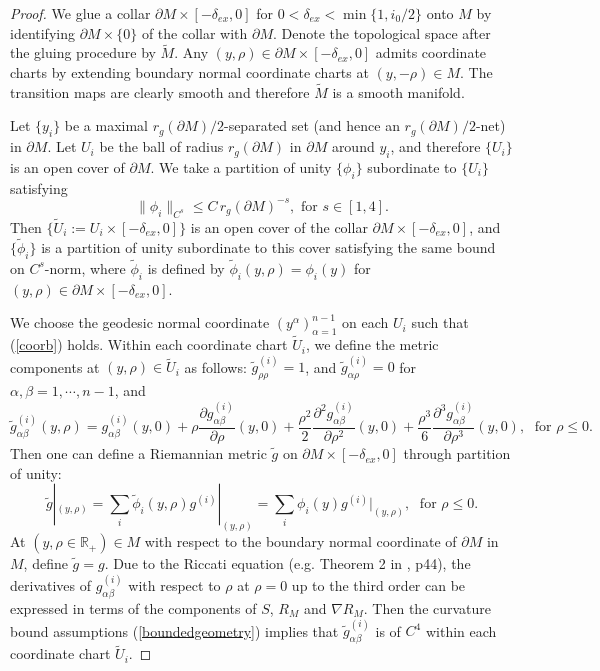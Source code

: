 \documentclass[11pt,letterpaper]{amsart}
\numberwithin{equation}{section}
\theoremstyle{definition}
\theoremstyle{plain}
\theoremstyle{definition}
\theoremstyle{plain}
\theoremstyle{definition}
\theoremstyle{plain}
\begin{document}
\begin{proof}
We glue a collar $\partial M \times [-\delta_{ex},0]$ for $0<\delta_{ex}<\min\{1,i_0/2\}$ onto $M$ by identifying $\partial M\times \{0\}$ of the collar with $\partial M$. Denote the topological space after the gluing procedure by $\widetilde{M}$. Any $(y,\rho)\in \partial M \times [-\delta_{ex},0]$ admits coordinate charts by extending boundary normal coordinate charts at $(y,-\rho)\in M$. The transition maps are clearly smooth and therefore $\widetilde{M}$ is a smooth manifold.

Let $\{y_i\}$ be a maximal $r_g(\partial M)/2$-separated set (and hence an $r_g(\partial M)/2$-net) in $\partial M$. Let $U_i$ be the ball of radius $r_g(\partial M)$ in $\partial M$ around $y_i$, and therefore $\{U_i\}$ is an open cover of $\partial M$. We take a partition of unity $\{\phi_i\}$ subordinate to $\{U_i\}$ satisfying 
$$\|\phi_i\|_{C^s}\leqslant C\,r_g(\partial M)^{-s},\textrm{ for }s\in [1,4].$$
Then $\{\widetilde{U}_i:=U_i\times [-\delta_{ex},0]\}$ is an open cover of the collar $\partial M \times [-\delta_{ex},0]$, and $\{\widetilde{\phi}_i\}$ is a partition of unity subordinate to this cover satisfying the same bound on $C^s$-norm, where $\widetilde{\phi}_i$ is defined by $\widetilde{\phi}_i(y,\rho)=\phi_i(y)$ for $(y,\rho)\in \partial M \times [-\delta_{ex},0]$.

We choose the geodesic normal coordinate $(y^{\alpha})_{\alpha=1}^{n-1}$ on each $U_i$ such that (\ref{coorb}) holds. Within each coordinate chart $\widetilde{U}_i$, we define the metric components at $(y,\rho)\in \widetilde{U}_i$ as follows: $\widetilde{g}^{(i)}_{\rho\rho}=1$, and $\widetilde{g}^{(i)}_{\alpha \rho}=0$ for $\alpha,\beta=1,\cdots,n-1$, and 
\begin{equation*}
\widetilde{g}^{(i)}_{\alpha\beta}(y,\rho)=g^{(i)}_{\alpha\beta}(y,0)+\rho \frac{\partial g^{(i)}_{\alpha\beta}}{\partial \rho} (y,0)+\frac{\rho^2}{2} \frac{\partial^2 g^{(i)}_{\alpha\beta}}{\partial \rho^2} (y,0)+ \frac{\rho^3}{6} \frac{\partial^3 g^{(i)}_{\alpha\beta}}{\partial \rho^3} (y,0), \;\textrm{ for }\rho\leqslant 0.
\end{equation*}
Then one can define a Riemannian metric $\widetilde{g}$ on $\partial M\times [-\delta_{ex},0]$ through partition of unity:
\begin{equation}\label{metricpartition}
\widetilde{g}|_{(y,\rho)}=\sum_i \widetilde{\phi}_i(y,\rho) g^{(i)}|_{(y,\rho)}=\sum_i \phi_i(y) g^{(i)}|_{(y,\rho)},\;\textrm{ for }\rho\leqslant 0.
\end{equation}
At $(y,\rho\in \mathbb{R}_{+})\in M$ with respect to the boundary normal coordinate of $\partial M$ in $M$, define $\widetilde{g}=g$. Due to the Riccati equation (e.g. Theorem 2 in \cite{PP}, p44), 
the derivatives of $g^{(i)}_{\alpha\beta}$ with respect to $\rho$ at $\rho=0$ up to the third order can be expressed in terms of the components of $S$, $R_M$ and $\nabla R_{M}$. Then the curvature bound assumptions (\ref{boundedgeometry}) implies that $\widetilde{g}_{\alpha\beta}^{(i)}$ is of $C^4$ within each coordinate chart $\widetilde{U}_i$. 


\end{proof}
\end{document}

